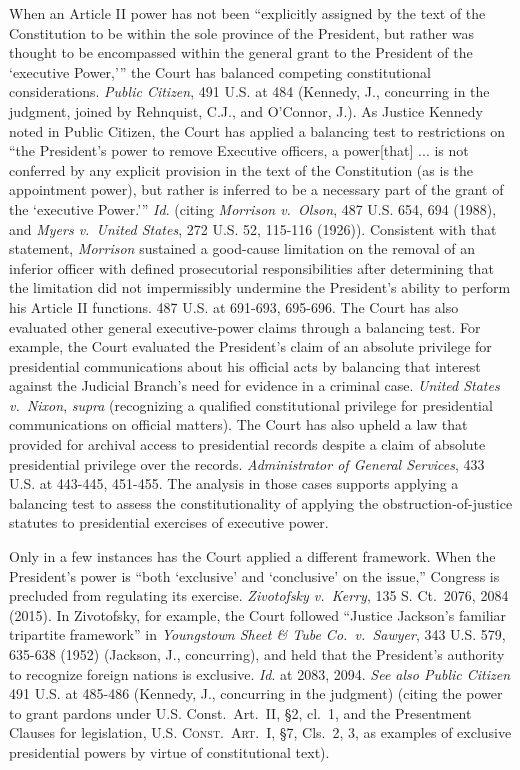 When an Article II power has not been “explicitly assigned by the text of the Constitution to be within the sole province of the President, but rather was thought to be encompassed within the general grant to the President of the ‘executive Power,’” the Court has balanced competing constitutional considerations.
\textit{Public Citizen}, 491 U.S. at 484 (Kennedy, J., concurring in the judgment, joined by Rehnquist, C.J., and O’Connor, J.).
As Justice Kennedy noted in Public Citizen, the Court has applied a balancing test to restrictions on “the President’s power to remove Executive officers, a power[that] ... is not conferred by any explicit provision in the text of the Constitution (as is the appointment power), but rather is inferred to be a necessary part of the grant of the ‘executive Power.’”
\textit{Id}. (citing \textit{Morrison v.\ Olson}, 487 U.S. 654, 694 (1988), and \textit{Myers v.\ United States}, 272 U.S. 52, 115-116 (1926)).
Consistent with that statement, \textit{Morrison} sustained a good-cause limitation on the removal of an inferior officer with defined prosecutorial responsibilities after determining that the limitation did not impermissibly undermine the President’s ability to perform his Article II functions.
487 U.S. at 691-693, 695-696.
The Court has also evaluated other general executive-power claims through a balancing test.
For example, the Court evaluated the President’s claim of an absolute privilege for presidential communications about his official acts by balancing that interest against the Judicial Branch’s need for evidence in a criminal case.
\textit{United States v.\ Nixon}, \textit{supra} (recognizing a qualified constitutional privilege for presidential communications on official matters).
The Court has also upheld a law that provided for archival access to presidential records despite a claim of absolute presidential privilege over the records.
\textit{Administrator of General Services}, 433 U.S. at 443-445, 451-455.
The analysis in those cases supports applying a balancing test to assess the constitutionality of applying the obstruction-of-justice statutes to presidential exercises of executive power.

Only in a few instances has the Court applied a different framework.
When the President’s power is “both ‘exclusive’ and ‘conclusive’ on the issue,” Congress is precluded from regulating its exercise.
\textit{Zivotofsky v.\ Kerry}, 135 S. Ct.~2076, 2084 (2015).
In Zivotofsky, for example, the Court followed “Justice Jackson’s familiar tripartite framework” in \textit{Youngstown Sheet \& Tube Co.\ v.\ Sawyer}, 343 U.S. 579, 635-638 (1952) (Jackson, J., concurring), and held that the President’s authority to recognize foreign nations is exclusive.
\textit{Id}. at 2083, 2094.
\textit{See also Public Citizen} 491 U.S. at 485-486 (Kennedy, J., concurring in the judgment) (citing the power to grant pardons under U.S. Const.\ Art.~II, \S 2, cl.~1, and the Presentment Clauses for legislation, \textsc{U.S. Const.\ Art.~I}, \S 7, Cls.~2, 3, as examples of exclusive presidential powers by virtue of constitutional text).

